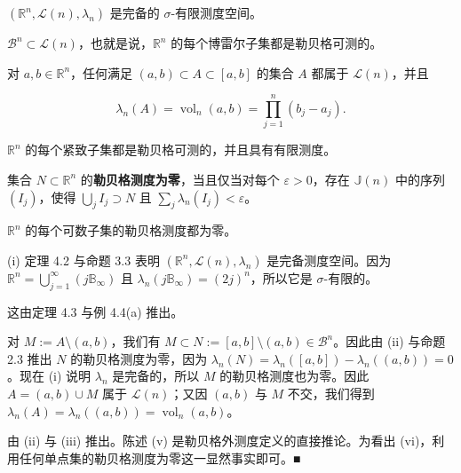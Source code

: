 \begin{theorem}

\begin{subitems}
\item

$ (\mathbb{R}^n, \mathcal{L}(n), \lambda_n) $ 是完备的 $ \sigma $-有限测度空间。

\item

$ \mathcal{B}^n \subset \mathcal{L}(n) $，也就是说，$ \mathbb{R}^n $ 的每个博雷尔子集都是勒贝格可测的。

\item

对 $ a, b \in \mathbb{R}^n $，任何满足 $ (a, b) \subset A \subset [a, b] $ 的集合 $ A $ 都属于 $ \mathcal{L}(n) $，并且

\[
\lambda_n(A) = \operatorname{vol}_n(a, b) = \prod_{j=1}^{n} (b_j - a_j) .
\]
\item

$ \mathbb{R}^n $ 的每个紧致子集都是勒贝格可测的，并且具有有限测度。

\item

集合 $ N \subset \mathbb{R}^n $ 的\textbf{勒贝格测度为零}，当且仅当对每个 $ \varepsilon > 0 $，存在 $ \mathbb{J}(n) $ 中的序列 $ (I_j) $，使得 $ \bigcup_j I_j \supset N $ 且 $ \sum_j \lambda_n(I_j) < \varepsilon $。

\item

$ \mathbb{R}^n $ 的每个可数子集的勒贝格测度都为零。

\proofhead
(i) 定理 4.2 与命题 3.3 表明 $ (\mathbb{R}^n, \mathcal{L}(n), \lambda_n) $ 是完备测度空间。因为 $ \mathbb{R}^n = \bigcup_{j=1}^{\infty} (j\mathbb{B}_{\infty}) $ 且 $ \lambda_n(j\mathbb{B}_{\infty}) = (2j)^n $，所以它是 $ \sigma $-有限的。
\end{subitems}

\begin{subitems}
\item[（ii）]

这由定理 4.3 与例 4.4(a) 推出。

\item[（iii）]

对 $ M := A \setminus (a, b) $，我们有 $ M \subset N := [a, b] \setminus (a, b) \in \mathcal{B}^n $。因此由 (ii) 与命题 2.3 推出 $ N $ 的勒贝格测度为零，因为 $ \lambda_n(N) = \lambda_n([a, b]) - \lambda_n((a, b)) = 0 $。现在 (i) 说明 $ \lambda_n $ 是完备的，所以 $ M $ 的勒贝格测度也为零。因此 $ A = (a, b) \cup M $ 属于 $ \mathcal{L}(n) $；又因 $ (a, b) $ 与 $ M $ 不交，我们得到 $ \lambda_n(A) = \lambda_n((a, b)) = \operatorname{vol}_n(a, b) $。

\item[（iv）]

由 (ii) 与 (iii) 推出。陈述 (v) 是勒贝格外测度定义的直接推论。为看出 (vi)，利用任何单点集的勒贝格测度为零这一显然事实即可。\nobreak\hspace{0.35em}■

\end{subitems}

\end{theorem}

